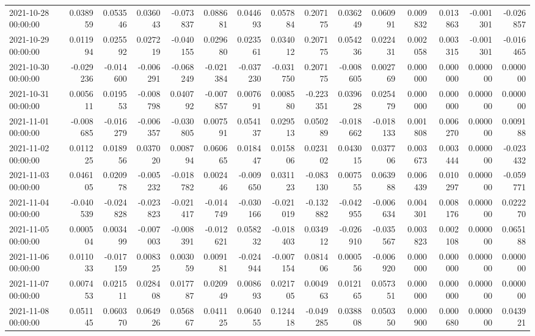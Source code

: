 \begin{tabular}{lrrrrrrrrrrrrrr}
2021-10-28 00:00:00 & 0.038959 & 0.053546 & 0.036043 & -0.073837 & 0.088681 & 0.044693 & 0.057884 & 0.207175 & 0.036249 & 0.060991 & 0.009832 & 0.013863 & -0.001301 & -0.026857 \\
2021-10-29 00:00:00 & 0.011994 & 0.025592 & 0.027219 & -0.040155 & 0.029680 & 0.023561 & 0.034012 & 0.207175 & 0.054236 & 0.022431 & 0.002058 & 0.003315 & -0.001301 & -0.016465 \\
2021-10-30 00:00:00 & -0.029236 & -0.014600 & -0.006291 & -0.068249 & -0.021384 & -0.037230 & -0.031750 & 0.207175 & -0.008605 & 0.002769 & 0.000000 & 0.000000 & 0.000000 & 0.000000 \\
2021-10-31 00:00:00 & 0.005611 & 0.019553 & -0.008798 & 0.040792 & -0.007857 & 0.007691 & 0.008580 & -0.223351 & 0.039628 & 0.025479 & 0.000000 & 0.000000 & 0.000000 & 0.000000 \\
2021-11-01 00:00:00 & -0.008685 & -0.016279 & -0.006357 & -0.030805 & 0.007591 & 0.054137 & 0.029513 & 0.050289 & -0.018662 & -0.018133 & 0.001808 & 0.006270 & 0.000000 & 0.009188 \\
2021-11-02 00:00:00 & 0.011225 & 0.018956 & 0.037020 & 0.008794 & 0.060665 & 0.018447 & 0.015806 & 0.023102 & 0.043015 & 0.037706 & 0.003673 & 0.003444 & 0.000000 & -0.023432 \\
2021-11-03 00:00:00 & 0.046105 & 0.020978 & -0.005232 & -0.018782 & 0.002446 & -0.009650 & 0.031123 & -0.083130 & 0.007555 & 0.063988 & 0.006439 & 0.010297 & 0.000000 & -0.059771 \\
2021-11-04 00:00:00 & -0.040539 & -0.024828 & -0.023823 & -0.021417 & -0.014749 & -0.030166 & -0.021019 & -0.132882 & -0.042955 & -0.006634 & 0.004301 & 0.008176 & 0.000000 & 0.022270 \\
2021-11-05 00:00:00 & 0.000504 & 0.003499 & -0.007003 & -0.008391 & -0.012621 & 0.058232 & -0.018403 & 0.034912 & -0.026910 & -0.035567 & 0.003823 & 0.002108 & 0.000000 & 0.065188 \\
2021-11-06 00:00:00 & 0.011033 & -0.017159 & 0.008325 & 0.003059 & 0.009181 & -0.024944 & -0.007154 & 0.081406 & 0.000556 & -0.006920 & 0.000000 & 0.000000 & 0.000000 & 0.000000 \\
2021-11-07 00:00:00 & 0.007453 & 0.021511 & 0.028408 & 0.017787 & 0.020949 & 0.008693 & 0.021705 & 0.004963 & 0.012165 & 0.057351 & 0.000000 & 0.000000 & 0.000000 & 0.000000 \\
2021-11-08 00:00:00 & 0.051145 & 0.060370 & 0.064926 & 0.056867 & 0.041125 & 0.064055 & 0.124418 & -0.049285 & 0.038808 & 0.050350 & 0.000900 & 0.000680 & 0.000000 & 0.043921 \\

\end{tabular}
